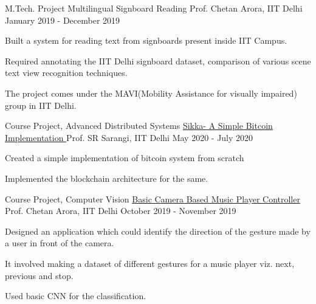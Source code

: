 \begin{cventries}
    \cventry
        {M.Tech. Project} %
        {Multilingual Signboard Reading} %
        {Prof. Chetan Arora, IIT Delhi} %
        {January 2019 - December 2019} %
        {
            \begin{cvitems} %
                \item Built a system for reading text from signboards present inside IIT Campus.
                \item Required annotating the IIT Delhi signboard dataset, comparison of various scene text view recognition techniques.
                \item The project comes under the MAVI(Mobility Assistance for visually impaired) group in IIT Delhi.
            \end{cvitems}
        }
        
     \cventry
        {Course Project, Advanced Distributed Systems} %
        {\href{https://github.com/gprateek93/Sikka--A-Simple-Bitcoin-Implementation}{Sikka- A Simple Bitcoin Implementation \ExternalLink}} %
        {Prof. SR Sarangi, IIT Delhi} %
        {May 2020 - July 2020} %
        {
            \begin{cvitems} %
                \item Created a simple implementation of bitcoin system from scratch
                \item Implemented the blockchain architecture for the same.
            \end{cvitems}
        }
    
        
    \cventry
        {Course Project, Computer Vision} %
        {\href{https://github.com/gprateek93/Basic-Camera-Based-Music-Player-Controller}{Basic Camera Based Music Player Controller \ExternalLink}} %
        {Prof. Chetan Arora, IIT Delhi} %
        {October 2019 - November 2019} %
        {
            \begin{cvitems} %
                \item Designed an application which could identify the direction of the gesture made by a user in front of the camera.
                \item It involved making a dataset of different gestures for a music player viz. next, previous and stop.
                \item Used basic CNN for the classification.
            \end{cvitems}
        }
        

\end{cventries}
